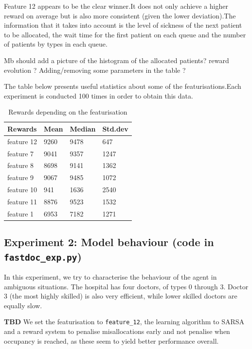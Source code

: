 \documentclass[11point]{article}
\newcommand{\note}[1]{\textbf{#1}}
\begin{document}
Feature 12 appears to be the clear winner.It does not only achieve a higher reward on average but is also more consistent (given the lower deviation).The information that it takes into account is the level of sickness of the next patient to be allocated, the wait time for the first patient on each queue and the number of patients by types in each queue.

Mb should add a picture of the histogram of the allocated patients? reward evolution ?
Adding/removing some parameters in the table ?



The table below presents useful statistics about some of the featurisations.Each experiment is conducted 
100 times in order to obtain this data.
\begin{table}[H]
    \centering 
    \begin{tabular}{|l|l|l|l|}
    \hline
    Rewards & Mean & Median & Std.dev \\
    \hline
     feature 12 & 9260 & 9478 & 647 \\
    \hline
    feature 7 & 9041 & 9357 & 1247 \\
    \hline
    feature 8 & 8698 & 9141 & 1362 \\
    \hline
    feature 9 & 9067 & 9485 & 1072 \\
    \hline
    feature 10 & 941 & 1636 & 2540 \\
    \hline
    feature 11 & 8876 & 9523 & 1532 \\
    \hline
    feature 1 & 6953 & 7182 & 1271 \\
    \hline 
    \end{tabular}
    \caption{Rewards depending on the featurisation}
    \label{tbl:feat}
\end{table}

\subsection{Experiment 2: Model behaviour (code in \texttt{fastdoc\_exp.py})}
 In this experiment, we try	to characterise the behaviour of the agent in ambiguous situations.
The hospital has four doctors, of types 0 through 3. Doctor 3 (the most highly skilled) is also very efficient, while lower skilled doctors are equally slow.

\note{TBD}
We set the featurisation to \texttt{feature\_12}, the learning algorithm to SARSA and a reward system to penalise misallocations early and not penalise when occupancy is reached, as these seem to yield better performance overall.
\end{document}
